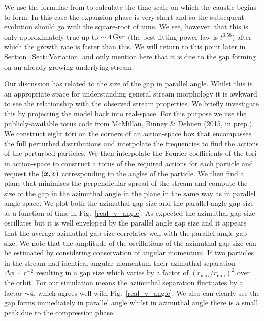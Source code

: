 \documentclass[useAMS,usenatbib,fleqn,a4paper]{mn2e}
\def\Gyr{\,{\rm Gyr}}
\newcommand{\bs}[1]{\bmath{#1}}
\begin{document}
We use the formulae from \cite{ErkalBelokurov2015} to calculate the time-scale on which the caustic begins to form. In this case the expansion phase is very short and so the subsequent evolution should go with the square-root of time. We see, however, that this is only approximately true up to $\sim4\Gyr$ (the best-fitting power law is $t^{0.58}$) after which the growth rate is faster than this. We will return to this point later in Section~\ref{Sect::Variation} and only mention here that it is due to the gap forming on an already growing underlying stream.

Our discussion has related to the size of the gap in parallel angle. Whilst this is an appropriate space for understanding general stream morphology it is awkward to see the relationship with the observed stream properties. We briefly investigate this by projecting the model back into real-space. For this purpose we use the publicly-available torus code from McMillan, Binney \& Dehnen (2015, in prep.). We construct eight tori on the corners of an action-space box that encompasses the full perturbed distributions and interpolate the frequencies to find the actions of the perturbed particles. We then interpolate the Fourier coefficients of the tori in action-space to construct a torus of the required actions for each particle and request the $(\bs{x},\bs{v})$ corresponding to the angles of the particle. We then find a plane that minimises the perpendicular spread of the stream and compute the size of the gap in the azimuthal angle in the plane in the same way as in parallel angle space. We plot both the azimuthal gap size and the parallel angle gap size as a function of time in Fig.~\ref{real_v_angle}. As expected the azimuthal gap size oscillates but it is well enveloped by the parallel angle gap size and it appears that the average azimuthal gap size correlates well with the parallel angle gap size. We note that the amplitude of the oscillations of the azimuthal gap size can be estimated by considering conservation of angular momentum. If two particles in the stream had identical angular momentum their azimuthal separation $\Delta\phi\sim r^{-2}$ resulting in a gap size which varies by a factor of $(r_\mathrm{max}/r_\mathrm{min})^2$ over the orbit. For our simulation means the azimuthal separation fluctuates by a factor $\sim 4$, which agrees well with Fig.~\ref{real_v_angle}. We also can clearly see the gap forms immediately in parallel angle whilst in azimuthal angle there is a small peak due to the compression phase.
\end{document}
